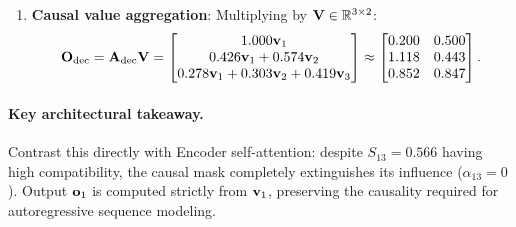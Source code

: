 \documentclass[../../main.tex]{subfiles}
\begin{document}
\begin{enumerate}
\begin{itemize}
\begin{align}
        \alpha_{21} &= \frac{1.811}{4.249} \approx 0.426, \quad
        \alpha_{22} = \frac{2.438}{4.249} \approx 0.574, \quad
        \alpha_{23} = 0.000.
        \end{align}
        Position 2 attends strictly to the prefix $\{y_1, y_2\}$; future token $y_3$ is zeroed out.
        \item \textbf{Row 3 ($y_3 = \text{``del''}$)}:
        $\exp(0.622) \approx 1.863$, $\exp(0.707) \approx 2.028$, $\exp(1.032) \approx 2.807$:
        \begin{equation}
        Z_3 = 1.863 + 2.028 + 2.807 = 6.698 \implies
        \alpha_{31} \approx 0.278, \quad \alpha_{32} \approx 0.303, \quad \alpha_{33} \approx 0.419.
        \end{equation}
    \end{itemize}
    This produces the strictly lower-triangular attention matrix:
    \begin{equation}
    \label{eq:dec_causal_weights}
    \mA_{\text{dec}} = \begin{bmatrix}
    1.000 & 0.000 & 0.000 \\
    0.426 & 0.574 & 0.000 \\
    0.278 & 0.303 & 0.419
    \end{bmatrix}.
    \end{equation}
    \item \textbf{Causal value aggregation}:
    Multiplying by $\mathbf{V} \in \mathbb{R}^{3 \times 2}$:
    \begin{equation}
    \label{eq:dec_output_matrix}
    \mathbf{O}_{\text{dec}} = \mathbf{A}_{\text{dec}} \mathbf{V} = \begin{bmatrix}
    1.000 \mathbf{v}_1 \\
    0.426 \mathbf{v}_1 + 0.574 \mathbf{v}_2 \\
    0.278 \mathbf{v}_1 + 0.303 \mathbf{v}_2 + 0.419 \mathbf{v}_3
    \end{bmatrix}
    \approx \begin{bmatrix}
    0.200 & 0.500 \\
    1.118 & 0.443 \\
    0.852 & 0.847
    \end{bmatrix}.
    \end{equation}
\end{enumerate}
\paragraph{Key architectural takeaway.}
Contrast this directly with Encoder self-attention: despite $S_{13} = 0.566$ having high compatibility, the causal mask completely extinguishes its influence ($\alpha_{13} = 0$). Output $\mathbf{o}_1$ is computed strictly from $\mathbf{v}_1$, preserving the causality required for autoregressive sequence modeling.
\end{document}

